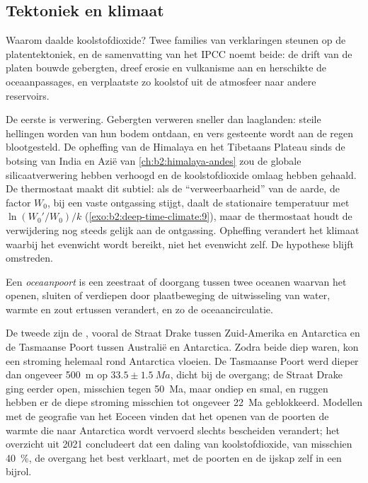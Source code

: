 \subsection*{Tektoniek en klimaat}

Waarom daalde koolstofdioxide? Twee families van verklaringen steunen op de platentektoniek, en de samenvatting van het
IPCC noemt beide: de drift van de platen bouwde gebergten, dreef erosie en vulkanisme aan en
herschikte de oceaanpassages, en verplaatste zo koolstof uit de atmosfeer naar andere reservoirs.

De eerste is verwering. Gebergten verweren sneller dan laaglanden: steile hellingen worden van hun
bodem ontdaan, en vers gesteente wordt aan de regen blootgesteld. De opheffing van de Himalaya en het Tibetaans Plateau sinds
de botsing van India en Azië van \cref{ch:b2:himalaya-andes} zou de globale
silicaatverwering hebben verhoogd en de koolstofdioxide omlaag hebben gehaald. De thermostaat maakt dit subtiel: als de
``verweerbaarheid'' van de aarde, de factor $W_0$, bij een vaste ontgassing stijgt, daalt de stationaire temperatuur
met $\ln(W_0'/W_0)/k$ (\cref{exo:b2:deep-time-climate:9}), maar de thermostaat houdt de
verwijdering nog steeds gelijk aan de ontgassing. Opheffing verandert het klimaat waarbij het evenwicht wordt bereikt, niet het
evenwicht zelf. De hypothese blijft omstreden.

\begin{definition}[Oceaanpoort]\label{def:b2:deep-time-climate:gateway}
Een \emph{oceaanpoort} is een zeestraat of doorgang tussen twee oceanen waarvan het openen,
sluiten of verdiepen door plaatbeweging de uitwisseling van water, warmte en zout ertussen verandert, en
zo de oceaancirculatie.
\end{definition}

De tweede zijn de , vooral de Straat Drake tussen Zuid-Amerika en Antarctica
en de Tasmaanse Poort tussen Australië en Antarctica. Zodra beide diep waren, kon een stroming
helemaal rond Antarctica vloeien. De Tasmaanse Poort werd dieper dan ongeveer \qty{500}{m} op $33.5 \pm
\qty{1.5}{Ma}$, dicht bij de overgang; de Straat Drake ging eerder open, misschien tegen \qty{50}{Ma},
maar ondiep en smal, en ruggen hebben er de diepe stroming misschien tot ongeveer \qty{22}{Ma} geblokkeerd. Modellen met
de geografie van het Eoceen vinden dat het openen van de poorten de warmte die naar
Antarctica wordt vervoerd slechts bescheiden verandert; het overzicht uit 2021 concludeert dat een daling van koolstofdioxide, van misschien
\qty{40}{\percent}, de overgang het best verklaart, met de poorten en de ijskap zelf in een
bijrol.

